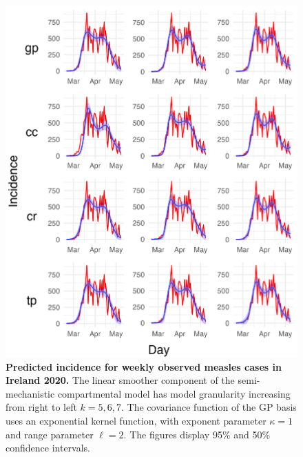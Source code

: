 \documentclass[
11pt, %
oneside, %
english, %
singlespacing, %
]{macthesis} %
\begin{document}
\begin{figure}[H]
\centering
\includegraphics[width=\textwidth, height = \textwidth]{figure/Ireland/Ireland_plot_gp(-3,5)_k(5,6,7)_gamma(014)_I0(10)_plot_incidence.png}
\caption[Predicted Covid-19 Incidence (2020)]{\textbf{Predicted incidence for weekly observed measles cases in Ireland 2020.} The linear smoother component of the semi-mechanistic compartmental model has model granularity increasing from right to left \(k= 5,6,7\). The covariance function of the GP basis uses an exponential kernel function, with exponent parameter \(\kappa = 1\) and range parameter \(\ell = 2\). The figures display 95\% and 50\% confidence intervals.}
\label{fig:ireland_inc}
\end{figure}
\end{document}
